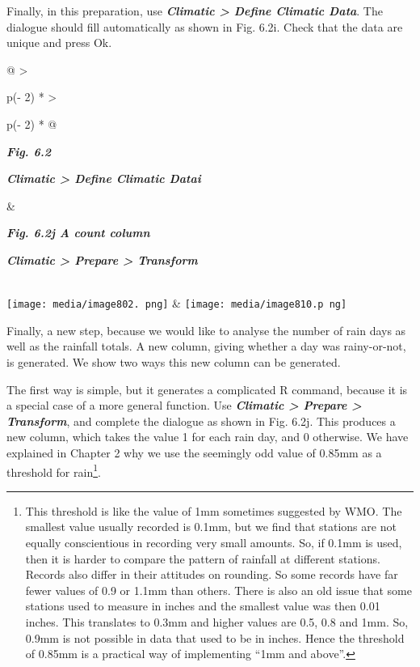 \documentclass[
  letterpaper,
  DIV=11,
  numbers=noendperiod]{scrreprt}
\begin{document}
Finally, in this preparation, use \textbf{\emph{Climatic \textgreater{}
Define Climatic Data}}. The dialogue should fill automatically as shown
in Fig. 6.2i. Check that the data are unique and press Ok.

\begin{longtable}[]{@{}
  >{\raggedright\arraybackslash}p{(\columnwidth - 2\tabcolsep) * }
  >{\raggedright\arraybackslash}p{(\columnwidth - 2\tabcolsep) * }@{}}
\toprule\noalign{}
\begin{minipage}[b]{\linewidth}\raggedright
\textbf{\emph{Fig. 6.2}}

\textbf{\emph{Climatic \textgreater{} Define Climatic Datai}}
\end{minipage} & \begin{minipage}[b]{\linewidth}\raggedright
\textbf{\emph{Fig. 6.2j A count column}}

\textbf{\emph{Climatic \textgreater{} Prepare \textgreater{} Transform}}
\end{minipage} \\
\midrule\noalign{}
\endhead
\bottomrule\noalign{}
\endlastfoot
\texttt{[image: media/image802. png]}
&
\texttt{[image: media/image810.p ng]} \\
\end{longtable}

Finally, a new step, because we would like to analyse the number of rain
days as well as the rainfall totals. A new column, giving whether a day
was rainy-or-not, is generated. We show two ways this new column can be
generated.

The first way is simple, but it generates a complicated R command,
because it is a special case of a more general function. Use
\textbf{\emph{Climatic \textgreater{} Prepare \textgreater{}
Transform}}, and complete the dialogue as shown in Fig. 6.2j. This
produces a new column, which takes the value 1 for each rain day, and 0
otherwise. We have explained in Chapter 2 why we use the seemingly odd
value of 0.85mm as a threshold for rain\footnote{This threshold is like
  the value of 1mm sometimes suggested by WMO. The smallest value
  usually recorded is 0.1mm, but we find that stations are not equally
  conscientious in recording very small amounts. So, if 0.1mm is used,
  then it is harder to compare the pattern of rainfall at different
  stations. Records also differ in their attitudes on rounding. So some
  records have far fewer values of 0.9 or 1.1mm than others. There is
  also an old issue that some stations used to measure in inches and the
  smallest value was then 0.01 inches. This translates to 0.3mm and
  higher values are 0.5, 0.8 and 1mm. So, 0.9mm is not possible in data
  that used to be in inches. Hence the threshold of 0.85mm is a
  practical way of implementing ``1mm and above''.}.
\end{document}
